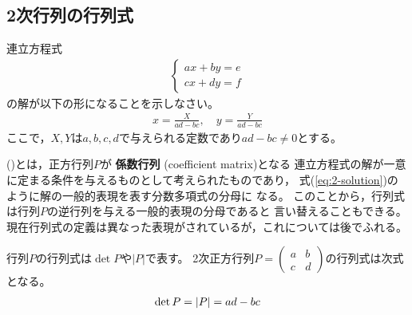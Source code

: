 \documentclass[twocolumn,11pt]{jarticle}
\begin{document}
\subsection{2次行列の行列式\label{sec:determinant}}
\nquestion
連立方程式
\begin{align}
  \begin{cases}
    ax+by=e\\
    cx+dy=f
  \end{cases}
\end{align}
の解が以下の形になることを示しなさい。
\begin{align}
  \label{eq:2-solution}
    x=\frac{X}{ad-bc},\quad
    y=\frac{Y}{ad-bc}
\end{align}
ここで，$X,Y$は$a,b,c,d$で与えられる定数であり$ad-bc\ne 0$とする。

\comment
{}()とは，正方行列$P$が
\textbf{係数行列}
(coefficient matrix)となる
連立方程式の解が一意に定まる条件を与えるものとして考えられたものであり，
式(\ref{eq:2-solution})のように解の一般的表現を表す分数多項式の分母に
なる。
このことから，行列式は行列$P$の逆行列を与える一般的表現の分母であると
言い替えることもできる。
現在行列式の定義は異なった表現がされているが，これについては後でふれる。

行列$P$の行列式は$\det P$や$|P|$で表す。
2次正方行列$P=
  \begin{pmatrix}
    a & b \\
    c & d
  \end{pmatrix}
$の行列式は次式となる。
\begin{align}
  \det P=|P|=ad-bc\notag
\end{align}
\end{document}
